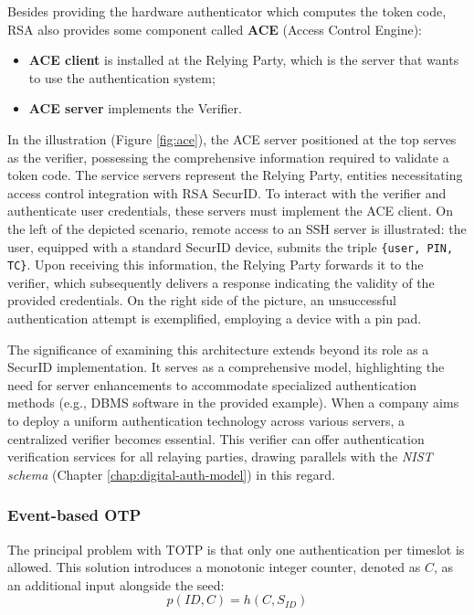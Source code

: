 Besides providing the hardware authenticator which computes the token code,
RSA also provides some component called \textbf{ACE} (Access Control Engine):
\begin{itemize}
	\item \textbf{ACE client} is installed at the Relying Party, which is the server that wants to use the authentication system;
	\item \textbf{ACE server} implements the Verifier.
\end{itemize}
In the illustration (Figure \ref{fig:ace}), the ACE server positioned at the top serves as the verifier, possessing the comprehensive information required to validate a token code. The service servers represent the Relying Party, entities necessitating access control integration with RSA SecurID. To interact with the verifier and authenticate user credentials, these servers must implement the ACE client. On the left of the depicted scenario, remote access to an SSH server is illustrated: the user, equipped with a standard SecurID device, submits the triple \texttt{\{user, PIN, TC\}}. Upon receiving this information, the Relying Party forwards it to the verifier, which subsequently delivers a response indicating the validity of the provided credentials. On the right side of the picture, an unsuccessful authentication attempt is exemplified, employing a device with a pin pad.

The significance of examining this architecture extends beyond its role as a SecurID implementation. It serves as a comprehensive model, highlighting the need for server enhancements to accommodate specialized authentication methods (e.g., DBMS software in the provided example). When a company aims to deploy a uniform authentication technology across various servers, a centralized verifier becomes essential. This verifier can offer authentication verification services for all relaying parties, drawing parallels with the \textit{NIST schema} (Chapter \ref{chap:digital-auth-model}) in this regard.



\subsubsection{Event-based OTP}
The principal problem with TOTP is that only one authentication per timeslot is allowed.
This solution introduces a monotonic integer counter, denoted as $C$, as an additional input alongside the seed:
\[
	p(ID, C) = h(C, S_{ID})
\]

